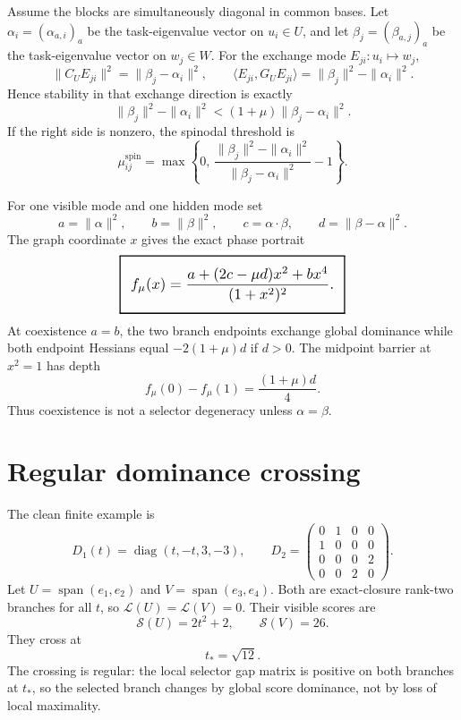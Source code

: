 \documentclass[11pt,a4paper]{article}
\numberwithin{equation}{section}
\DeclareMathOperator{\diag}{diag}
\DeclareMathOperator{\spanop}{span}
\newcommand{\geomboxed}[1]{%
  \setlength{\fboxsep}{8pt}%
  \setlength{\fboxrule}{0.9pt}%
  \fbox{\scalebox{1.18}{$\displaystyle #1$}}%
}
\theoremstyle{thmcompact}
\theoremstyle{remark}
\begin{document}
Assume the blocks are simultaneously diagonal in common bases. Let $\alpha_i=(\alpha_{a,i})_a$ be the task-eigenvalue vector on $u_i\in U$, and let $\beta_j=(\beta_{a,j})_a$ be the task-eigenvalue vector on $w_j\in W$. For the exchange mode $E_{ji}:u_i\mapsto w_j$,
\begin{equation}
\|C_UE_{ji}\|^2=\|\beta_j-\alpha_i\|^2,
\qquad
\langle E_{ji},G_UE_{ji}\rangle=\|\beta_j\|^2-\|\alpha_i\|^2.
\label{eq:exchange-mode}
\end{equation}
Hence stability in that exchange direction is exactly
\begin{equation}
\|\beta_j\|^2-\|\alpha_i\|^2
<
(1+\mu)\|\beta_j-\alpha_i\|^2.
\label{eq:exchange-stability}
\end{equation}
If the right side is nonzero, the spinodal threshold is
\begin{equation}
\mu_{ij}^{\mathrm{spin}}
=\max\!\left\{0,\,
\frac{\|\beta_j\|^2-\|\alpha_i\|^2}{\|\beta_j-\alpha_i\|^2}-1
\right\}.
\label{eq:spinodal}
\end{equation}

For one visible mode and one hidden mode set
\[
a=\|\alpha\|^2,\qquad b=\|\beta\|^2,\qquad c=\alpha\cdot\beta,\qquad d=\|\beta-\alpha\|^2.
\]
The graph coordinate $x$ gives the exact phase portrait
\begin{equation}
\geomboxed{
f_\mu(x)=\frac{a+(2c-\mu d)x^2+bx^4}{(1+x^2)^2}.
}
\label{eq:one-mode-phase}
\end{equation}
At coexistence $a=b$, the two branch endpoints exchange global dominance while both endpoint Hessians equal $-2(1+\mu)d$ if $d>0$. The midpoint barrier at $x^2=1$ has depth
\begin{equation}
f_\mu(0)-f_\mu(1)=\frac{(1+\mu)d}{4}.
\label{eq:barrier-depth}
\end{equation}
Thus coexistence is not a selector degeneracy unless $\alpha=\beta$.

\section{Regular dominance crossing}

The clean finite example is
\[
D_1(t)=\diag(t,-t,3,-3),
\qquad
D_2=
\begin{pmatrix}
0&1&0&0\\
1&0&0&0\\
0&0&0&2\\
0&0&2&0
\end{pmatrix}.
\]
Let $U=\spanop(e_1,e_2)$ and $V=\spanop(e_3,e_4)$. Both are exact-closure rank-two branches for all $t$, so $\mathcal L(U)=\mathcal L(V)=0$. Their visible scores are
\[
\mathcal S(U)=2t^2+2,\qquad \mathcal S(V)=26.
\]
They cross at
\[
t_*=\sqrt{12}.
\]
The crossing is regular: the local selector gap matrix is positive on both branches at $t_*$, so the selected branch changes by global score dominance, not by loss of local maximality.
\end{document}
